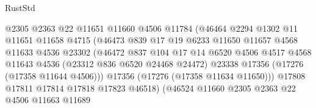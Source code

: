 \begin{lexlean}{RustStd}
\begin{coremodule}
                                    @2305
                                    @2363
                                    @22
                                    @11651
                                    @11660
                                    @4506
                                    @11784
                                    (@46464
                                      @2294
                                      @1302
                                      @11
                                      @11651
                                      @11658
                                      @4715
                                      (@46473
                                        @839
                                        @17
                                        @19
                                        @6233
                                        @11650
                                        @11657
                                        @4568
                                        @11633
                                        @4536
                                        @23302
                                        (@46472
                                          @837
                                          @104
                                          @17
                                          @14
                                          @6520
                                          @4506
                                          @4517
                                          @4568
                                          @11643
                                          @4536
                                          (@23312 @836 @6520 @24468 @24472)
                                          @23338
                                          @17356
                                          (@17276 (@17358 @11644 @4506)))
                                        @17356
                                        (@17276 (@17358 @11634 @11650)))
                                      @17808
                                      @17811
                                      @17814
                                      @17818
                                      @17823
                                      @46518)
                                    (@46524
                                      @11660
                                      @2305
                                      @2363
                                      @22
                                      @4506
                                      @11663
                                      @11689

\end{coremodule}
\end{lexlean}
